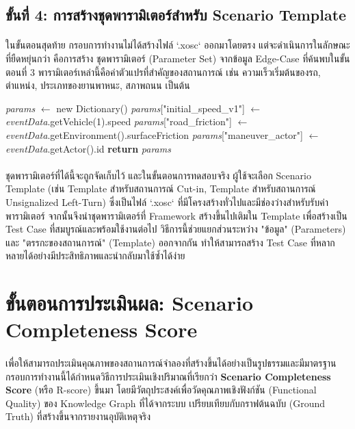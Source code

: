 \subsection{ขั้นที่ 4: การสร้างชุดพารามิเตอร์สำหรับ Scenario Template}\label{subsec:ch4_scenario_generation}

\paragraph{}
ในขั้นตอนสุดท้าย กรอบการทำงานไม่ได้สร้างไฟล์ `.xosc` ออกมาโดยตรง แต่จะดำเนินการในลักษณะที่ยืดหยุ่นกว่า คือการสร้าง ชุดพารามิเตอร์ (Parameter Set) จากข้อมูล Edge-Case ที่ค้นพบในขั้นตอนที่ 3 พารามิเตอร์เหล่านี้คือค่าตัวแปรที่สำคัญของสถานการณ์ เช่น ความเร็วเริ่มต้นของรถ, ตำแหน่ง, ประเภทของยานพาหนะ, สภาพถนน เป็นต้น

\begin{algorithmic}[1]
    \State \textit{params} $\gets$ new Dictionary()
    \State \textit{params}["initial\_speed\_v1"] $\gets$ \textit{eventData}.getVehicle(1).speed
    \State \textit{params}["road\_friction"] $\gets$ \textit{eventData}.getEnvironment().surfaceFriction
    \State \textit{params}["maneuver\_actor"] $\gets$ \textit{eventData}.getActor().id
    \State \textbf{return} \textit{params}
\EndFunction
\end{algorithmic}

\paragraph{}
ชุดพารามิเตอร์ที่ได้นี้จะถูกจัดเก็บไว้ และในขั้นตอนการทดสอบจริง ผู้ใช้จะเลือก Scenario Template (เช่น Template สำหรับสถานการณ์ Cut-in, Template สำหรับสถานการณ์ Unsignalized Left-Turn) ซึ่งเป็นไฟล์ `.xosc` ที่มีโครงสร้างทั่วไปและมีช่องว่างสำหรับรับค่าพารามิเตอร์ จากนั้นจึงนำชุดพารามิเตอร์ที่ Framework สร้างขึ้นไปเติมใน Template เพื่อสร้างเป็น Test Case ที่สมบูรณ์และพร้อมใช้งานต่อไป วิธีการนี้ช่วยแยกส่วนระหว่าง "ข้อมูล" (Parameters) และ "ตรรกะของสถานการณ์" (Template) ออกจากกัน ทำให้สามารถสร้าง Test Case ที่หลากหลายได้อย่างมีประสิทธิภาพและนำกลับมาใช้ซ้ำได้ง่าย
\section{ขั้นตอนการประเมินผล: Scenario Completeness Score}\label{sec:ch4_evaluation_method}
\paragraph{}
เพื่อให้สามารถประเมินคุณภาพของสถานการณ์จำลองที่สร้างขึ้นได้อย่างเป็นรูปธรรมและมีมาตรฐาน กรอบการทำงานนี้ได้กำหนดวิธีการประเมินเชิงปริมาณที่เรียกว่า \textbf{Scenario Completeness Score} (หรือ R-score) ขึ้นมา โดยมีวัตถุประสงค์เพื่อวัดคุณภาพเชิงฟังก์ชัน (Functional Quality) ของ Knowledge Graph ที่ได้จากระบบ เปรียบเทียบกับกราฟต้นฉบับ (Ground Truth) ที่สร้างขึ้นจากรายงานอุบัติเหตุจริง

